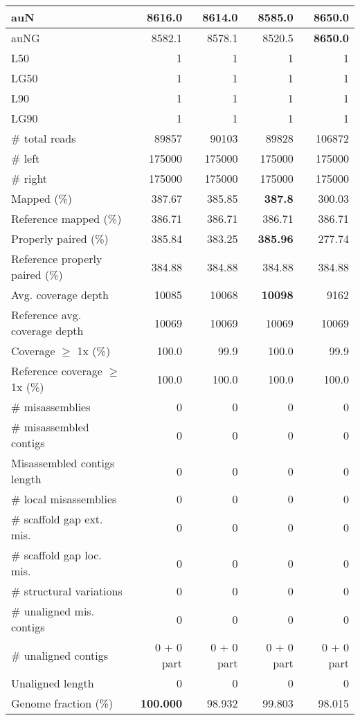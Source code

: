 \documentclass[12pt,a4paper]{article}
\begin{document}
\begin{table}[ht]
\begin{center}
\begin{tabular}{|l*{4}{|r}|}
auN & 8616.0 & 8614.0 & 8585.0 & {\bf 8650.0} \\ \hline
auNG & 8582.1 & 8578.1 & 8520.5 & {\bf 8650.0} \\ \hline
L50 & 1 & 1 & 1 & 1 \\ \hline
LG50 & 1 & 1 & 1 & 1 \\ \hline
L90 & 1 & 1 & 1 & 1 \\ \hline
LG90 & 1 & 1 & 1 & 1 \\ \hline
\# total reads & 89857 & 90103 & 89828 & 106872 \\ \hline
\# left & 175000 & 175000 & 175000 & 175000 \\ \hline
\# right & 175000 & 175000 & 175000 & 175000 \\ \hline
Mapped (\%) & 387.67 & 385.85 & {\bf 387.8} & 300.03 \\ \hline
Reference mapped (\%) & 386.71 & 386.71 & 386.71 & 386.71 \\ \hline
Properly paired (\%) & 385.84 & 383.25 & {\bf 385.96} & 277.74 \\ \hline
Reference properly paired (\%) & 384.88 & 384.88 & 384.88 & 384.88 \\ \hline
Avg. coverage depth & 10085 & 10068 & {\bf 10098} & 9162 \\ \hline
Reference avg. coverage depth & 10069 & 10069 & 10069 & 10069 \\ \hline
Coverage $\geq$ 1x (\%) & 100.0 & 99.9 & 100.0 & 99.9 \\ \hline
Reference coverage $\geq$ 1x (\%) & 100.0 & 100.0 & 100.0 & 100.0 \\ \hline
\# misassemblies & 0 & 0 & 0 & 0 \\ \hline
\# misassembled contigs & 0 & 0 & 0 & 0 \\ \hline
Misassembled contigs length & 0 & 0 & 0 & 0 \\ \hline
\# local misassemblies & 0 & 0 & 0 & 0 \\ \hline
\# scaffold gap ext. mis. & 0 & 0 & 0 & 0 \\ \hline
\# scaffold gap loc. mis. & 0 & 0 & 0 & 0 \\ \hline
\# structural variations & 0 & 0 & 0 & 0 \\ \hline
\# unaligned mis. contigs & 0 & 0 & 0 & 0 \\ \hline
\# unaligned contigs & 0 + 0 part & 0 + 0 part & 0 + 0 part & 0 + 0 part \\ \hline
Unaligned length & 0 & 0 & 0 & 0 \\ \hline
Genome fraction (\%) & {\bf 100.000} & 98.932 & 99.803 & 98.015 \\ \hline

\end{tabular}
\end{center}
\end{table}
\end{document}
